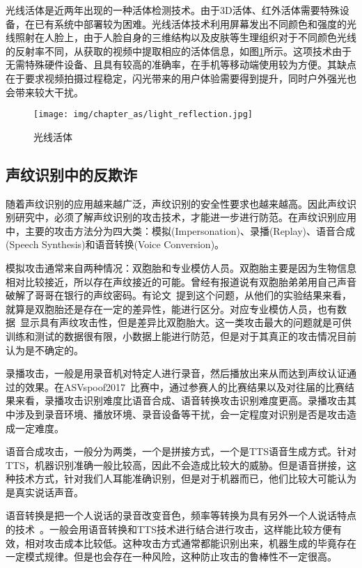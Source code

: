 \documentclass[graybox,envcountchap,sectrefs]{svmono}
\begin{document}
光线活体是近两年出现的一种活体检测技术。由于3D活体、红外活体需要特殊设备，在已有系统中部署较为困难。光线活体技术利用屏幕发出不同颜色和强度的光线照射在人脸上，由于人脸自身的三维结构以及皮肤等生理组织对于不同颜色光线的反射率不同，从获取的视频中提取相应的活体信息，如图\ref{fig:light_reflection}所示。这项技术由于无需特殊硬件设备、且具有较高的准确率，在手机等移动端使用较为方便。其缺点在于要求视频拍摄过程稳定，闪光带来的用户体验需要得到提升，同时户外强光也会带来较大干扰\cite{liu2019aurora}。

\begin{figure}[ht]
\centering
\texttt{[image: img/chapter\_as/light\_reflection.jpg]}
\caption{光线活体}
\label{fig:light_reflection}
\end{figure}



\subsection{声纹识别中的反欺诈}

随着声纹识别的应用越来越广泛，声纹识别的安全性要求也越来越高。因此声纹识别研究中，必须了解声纹识别的攻击技术，才能进一步进行防范。在声纹识别应用中，主要的攻击方法分为四大类：模拟(Impersonation)、录播(Replay)、语音合成(Speech Synthesis)和语音转换(Voice Conversion)。

模拟攻击通常来自两种情况：双胞胎和专业模仿人员。双胞胎主要是因为生物信息相对比较接近，所以存在声纹接近的可能。曾经有报道说有双胞胎弟弟用自己声音破解了哥哥在银行的声纹密码。有论文~\cite{patil2005speaker}提到这个问题，从他们的实验结果来看，就算是双胞胎还是存在一定的差异性，能进行区分。对应专业模仿人员，也有数据~\cite{patil2008lp}显示具有声纹攻击性，但是差异比双胞胎大。这一类攻击最大的问题就是可供训练和测试的数据很有限，小数据上能进行防范，但是对于其真正的攻击情况目前认为是不确定的。

录播攻击，一般是用录音机对特定人进行录音，然后播放出来从而达到声纹认证通过的效果。在ASVspoof2017~\cite{kinnunen2017asvspoof}比赛中，通过参赛人的比赛结果以及对往届的比赛结果来看，录播攻击识别难度比语音合成、语音转换攻击识别难度更高。录播攻击其中涉及到录音环境、播放环境、录音设备等干扰，会一定程度对识别是否是攻击造成一定难度。

语音合成攻击，一般分为两类，一个是拼接方式，一个是TTS语音生成方式。针对TTS，机器识别准确一般比较高，因此不会造成比较大的威胁。但是语音拼接，这种技术方式，针对我们人耳能准确识别，但是对于机器而已，他们比较大可能认为是真实说话声音。

语音转换是把一个人说话的录音改变音色，频率等转换为具有另外一个人说话特点的技术~\cite{jia2018transfer}。一般会用语音转换和TTS技术进行结合进行攻击，这样能比较方便有效，相对攻击成本比较低。这种攻击方式通常都能识别出来，机器生成的毕竟存在一定模式规律。但是也会存在一种风险，这种防止攻击的鲁棒性不一定很高。
\end{document}

